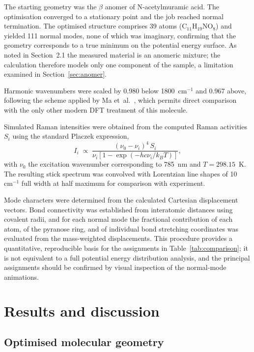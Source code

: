 \documentclass[preprint,12pt]{elsarticle}
\newcommand{\wn}{\ensuremath{\mathrm{cm}^{-1}}}
\begin{document}
The starting geometry was the $\beta$ anomer of N-acetylmuramic acid. The
optimisation converged to a stationary point and the job reached normal
termination. The optimised structure comprises 39 atoms
(C$_{11}$H$_{19}$NO$_8$) and yielded 111 normal modes, none of which was
imaginary, confirming that the geometry corresponds to a true minimum on the
potential energy surface. As noted in Section~2.1 the measured material is an
anomeric mixture; the calculation therefore models only one component of the
sample, a limitation examined in Section~\ref{sec:anomer}.

Harmonic wavenumbers were scaled by 0.980 below 1800~\wn{} and 0.967 above,
following the scheme applied by Ma et~al.\ \cite{ma2024ecoli}, which permits
direct comparison with the only other modern DFT treatment of this molecule.

Simulated Raman intensities were obtained from the computed Raman activities
$S_i$ using the standard Placzek expression,
\begin{equation}
I_i \;\propto\; \frac{(\nu_0-\nu_i)^4\,S_i}
{\nu_i\left[1-\exp\!\left(-hc\nu_i/k_BT\right)\right]},
\end{equation}
with $\nu_0$ the excitation wavenumber corresponding to 785~nm and
$T = 298.15$~K. The resulting stick spectrum was convolved with Lorentzian
line shapes of 10~\wn{} full width at half maximum for comparison with
experiment.

Mode characters were determined from the calculated Cartesian displacement
vectors. Bond connectivity was established from interatomic distances using
covalent radii, and for each normal mode the fractional contribution of each
atom, of the pyranose ring, and of individual bond stretching coordinates was
evaluated from the mass-weighted displacements. This procedure provides a
quantitative, reproducible basis for the assignments in
Table~\ref{tab:comparison}; it is not equivalent to a full potential energy
distribution analysis, and the principal assignments should be confirmed by
visual inspection of the normal-mode animations.

\section{Results and discussion}

\subsection{Optimised molecular geometry}
\end{document}
